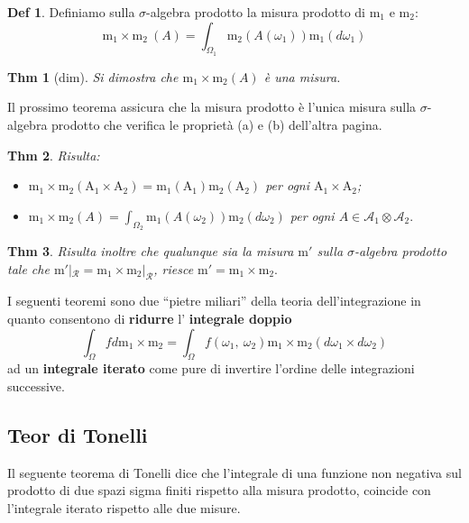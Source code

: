 \documentclass[a4paper,11pt]{article}
\theoremstyle{plain}
\newtheorem{thm}{Thm}[section]
\theoremstyle{definition}
\newtheorem{defn}{Def}[section]
\theoremstyle{remark}
\begin{document}
 \begin{defn}Definiamo sulla $\sigma$-algebra prodotto la misura prodotto di $\mathrm{m}_{1}$ e $\mathrm{m}_{2}$: 
 $$
 \mathrm{m}_{1}\times \mathrm{m}_{2} \ (A)=\int_{\Omega_{1}}\mathrm{m}_{2}(A(\omega_{1}))\mathrm{m}_{1}(d\omega_{1})
 $$
 \end{defn}

\begin{thm}[dim] Si dimostra che $\mathrm{m}_{1}\times \mathrm{m}_{2}(A)$ è una misura.
\end{thm}
 
\noindent 
 Il prossimo teorema assicura che la misura prodotto è l'unica misura sulla $\sigma$-algebra prodotto che verifica le proprietà (a) e (b) dell'altra pagina.

 \begin{thm}Risulta:
 \begin{itemize}
 \item $\mathrm{m}_{1}\times \mathrm{m}_{2}(\mathrm{A}_{1}\times \mathrm{A}_{2})=\mathrm{m}_{1}(\mathrm{A}_{1})\mathrm{m}_{2}(\mathrm{A}_{2})$ per ogni $\mathrm{A}_{1}\times \mathrm{A}_{2}$;
 \item $\displaystyle \mathrm{m}_{1}\times \mathrm{m}_{2}(A)=\int_{\Omega_{2}}\mathrm{m}_{1}(A(\omega_{2}))\mathrm{m}_{2}(d\omega_{2})$ per ogni $A\in \mathcal{A}_{1}\otimes \mathcal{A}_{2}.$
 \end{itemize}
 \end{thm}
 
 \begin{thm} Risulta inoltre che qualunque sia la misura $\mathrm{m}'$ sulla $\sigma$-algebra prodotto tale che $\mathrm{m}'|_{\mathcal{R}}= \mathrm{m}_{1}\times \mathrm{m}_{2}|_{\mathcal{R}}$, riesce $\mathrm{m}'=\mathrm{m}_{1}\times \mathrm{m}_{2}.$
 \end{thm}
 
 I seguenti teoremi sono due “pietre miliari'' della teoria dell'integrazione in quanto consentono di \textbf{ridurre} l' \textbf{integrale doppio} $$
\int_{\Omega}fd\mathrm{m}_{1}\times \mathrm{m}_{2}=\int_{\Omega}f(\omega_{1},\ \omega_{2})\mathrm{m}_{1}\times \mathrm{m}_{2}(d\omega_{1}\times d\omega_{2})
$$
ad un \textbf{integrale iterato} come pure di invertire l'ordine delle integrazioni successive.

\subsection{Teor di Tonelli}
Il seguente teorema di Tonelli dice che  l'integrale di una funzione non negativa sul prodotto di due spazi sigma finiti rispetto alla misura prodotto, coincide con l'integrale iterato rispetto alle due misure.
\end{document}
